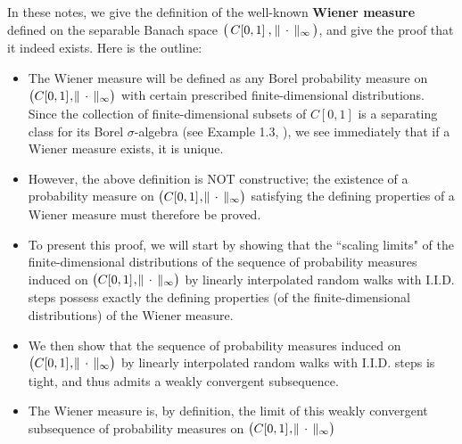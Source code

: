 \documentclass[10pt, letterpaper]{article}
\newcommand{\Czo}{C[0,1]}
\begin{document}


\pagestyle{fancy}

\chead[]{{\Large\bf The Wiener Measure on $\left(\,\Czo\,\overset{{\color{white}1}}{,}\,\Vert\,\cdot\,\Vert_{\infty}\,\right)$} \\
\vskip 0.1cm \normalsize \today}
\lfoot[]{}
\cfoot[]{}
\rfoot[]{\thepage}



\mbox{}\vskip 0.0cm
\noindent
In these notes, we give the definition of the well-known \textbf{Wiener measure} defined
on the separable Banach space
$\left(\,\Czo\,\overset{{\color{white}1}}{,}\,\Vert\,\cdot\,\Vert_{\infty}\,\right)$,
and give the proof that it indeed exists.
Here is the outline:
\begin{itemize}
\item
	The Wiener measure will be defined as any Borel probability measure on
	$\left(\Czo\overset{{\color{white}1}}{,}\Vert\,\cdot\,\Vert_{\infty}\right)$
	with certain prescribed finite-dimensional distributions.
	Since the collection of finite-dimensional subsets of $\Czo$ is a separating class
	for its Borel $\sigma$-algebra (see Example 1.3, \cite{Billingsley1999}),
	we see immediately that if a Wiener measure exists, it is unique.
\item
	However, the above definition is NOT constructive;
	the existence of a probability measure on
	$\left(\Czo\overset{{\color{white}1}}{,}\Vert\,\cdot\,\Vert_{\infty}\right)$
	satisfying the defining properties of a Wiener measure must therefore be proved.
\item
	To present this proof, we will start by showing that
	the ``scaling limits" of the finite-dimensional distributions of
	the sequence of probability measures induced on
	$\left(\Czo\overset{{\color{white}1}}{,}\Vert\,\cdot\,\Vert_{\infty}\right)$
	by linearly interpolated random walks with I.I.D. steps possess exactly the
	defining properties (of the finite-dimensional distributions) of the Wiener measure.
\item
	We then show that
	the sequence of probability measures induced on
	$\left(\Czo\overset{{\color{white}1}}{,}\Vert\,\cdot\,\Vert_{\infty}\right)$
	by linearly interpolated random walks with I.I.D. steps is tight, and thus
	admits a weakly convergent subsequence.
\item
	The Wiener measure is, by definition, the limit of this
	weakly convergent subsequence of probability measures on
	$\left(\Czo\overset{{\color{white}1}}{,}\Vert\,\cdot\,\Vert_{\infty}\right)$
\end{itemize} 
\end{document}

